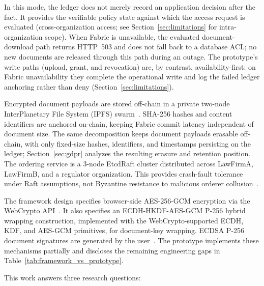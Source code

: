 \documentclass[preprint,12pt]{elsarticle}
\begin{document}
In this mode, the ledger does not merely record an application decision after
the fact. It provides the verifiable policy state against which the access
request is evaluated (cross-organization access; see
Section~\ref{sec:limitations} for intra-organization scope). When Fabric is
unavailable, the evaluated document-download path returns HTTP~503 and does
not fall back to a database ACL; no new documents are released through
this path during an outage. The prototype's write paths (upload, grant,
and revocation) are, by contrast, availability-first: on Fabric
unavailability they complete the operational write and log the failed
ledger anchoring rather than deny (Section~\ref{sec:limitations}).

Encrypted document payloads are stored off-chain in a private two-node
InterPlanetary File System (IPFS) swarm~\cite{benet2014ipfs}. SHA-256 hashes
and content identifiers are anchored on-chain, keeping Fabric commit latency
independent of document size. The same decomposition keeps document
payloads erasable off-chain, with only fixed-size hashes, identifiers, and
timestamps persisting on the ledger; Section~\ref{sec:gdpr} analyzes the
resulting erasure and retention position. The ordering service is a 3-node EtcdRaft
cluster distributed across LawFirmA, LawFirmB, and a regulator organization. This
provides crash-fault tolerance under Raft assumptions, not Byzantine
resistance to malicious orderer collusion~\cite{hyperledgerFabricOrderingService_v24,Ongaro2014}.

The framework design specifies browser-side AES-256-GCM encryption via the
WebCrypto API~\cite{fips197,w3cWebCrypto}. It also specifies an ECDH-HKDF-AES-GCM
P-256 hybrid wrapping construction, implemented with the
WebCrypto-supported ECDH, KDF, and AES-GCM primitives, for
document-key wrapping. ECDSA P-256 document
signatures are generated by the user~\cite{fips1865}. The prototype implements
these mechanisms partially and discloses the remaining engineering gaps in
Table~\ref{tab:framework_vs_prototype}.

This work answers three research questions:
\end{document}
